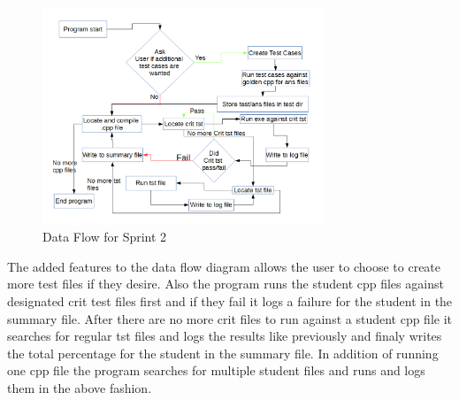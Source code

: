 \begin{figure}[H]
\begin{center}
\includegraphics[width=0.75\textwidth]{./DataFlowSprint2}
\end{center}
\caption{Data Flow for Sprint 2 \label{DataFlowSprint2}}
\end{figure}

The added features to the data flow diagram allows the user to choose to create more test files if they desire. Also the program runs the student cpp files against designated crit test files first and if they fail it logs a failure for the student in the summary file. After there are no more crit files to run against a student cpp file it searches for regular tst files and logs the results like previously and finaly writes the total percentage for the student in the summary file. In addition of running one cpp file the program searches for multiple student files and runs and logs them in the above fashion.

